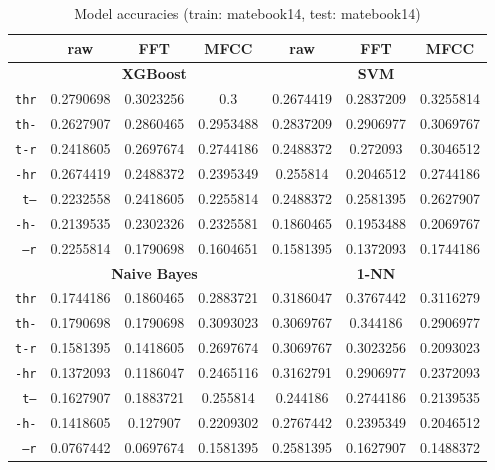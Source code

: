 \documentclass[../main.tex]{subfiles}
\begin{document}
\begin{table}[ht]
	\centering
	\caption{Model accuracies (train: matebook14, test: matebook14)}
	\vspace{-0.15cm}
	\label{tab:model_acc_matebook14_matebook14}
	\begin{small}
	\begin{tabular}{|r|c|c|c|c|c|c|}
		\hline
		 & \textbf{raw} & \textbf{FFT} & \textbf{MFCC} & \textbf{raw} & \textbf{FFT} & \textbf{MFCC} \\
		\hline
		 & \multicolumn{3}{|c|}{\textbf{XGBoost}} & \multicolumn{3}{|c|}{\textbf{SVM}} \\
		\hline
		\texttt{thr} & 0.2790698 & 0.3023256 & 0.3 & 0.2674419 & 0.2837209 & 0.3255814 \\
		\texttt{th-} & 0.2627907 & 0.2860465 & 0.2953488 & 0.2837209 & 0.2906977 & 0.3069767 \\
		\texttt{t-r} & 0.2418605 & 0.2697674 & 0.2744186 & 0.2488372 & 0.272093 & 0.3046512 \\
		\texttt{-hr} & 0.2674419 & 0.2488372 & 0.2395349 & 0.255814 & 0.2046512 & 0.2744186 \\
		\texttt{t--} & 0.2232558 & 0.2418605 & 0.2255814 & 0.2488372 & 0.2581395 & 0.2627907 \\
		\texttt{-h-} & 0.2139535 & 0.2302326 & 0.2325581 & 0.1860465 & 0.1953488 & 0.2069767 \\
		\texttt{--r} & 0.2255814 & 0.1790698 & 0.1604651 & 0.1581395 & 0.1372093 & 0.1744186 \\
		\hline
		 & \multicolumn{3}{|c|}{\textbf{Naive Bayes}} & \multicolumn{3}{|c|}{\textbf{1-NN}} \\
		\hline
		\texttt{thr} & 0.1744186 & 0.1860465 & 0.2883721 & 0.3186047 & 0.3767442 & 0.3116279 \\
		\texttt{th-} & 0.1790698 & 0.1790698 & 0.3093023 & 0.3069767 & 0.344186 & 0.2906977 \\
		\texttt{t-r} & 0.1581395 & 0.1418605 & 0.2697674 & 0.3069767 & 0.3023256 & 0.2093023 \\
		\texttt{-hr} & 0.1372093 & 0.1186047 & 0.2465116 & 0.3162791 & 0.2906977 & 0.2372093 \\
		\texttt{t--} & 0.1627907 & 0.1883721 & 0.255814 & 0.244186 & 0.2744186 & 0.2139535 \\
		\texttt{-h-} & 0.1418605 & 0.127907 & 0.2209302 & 0.2767442 & 0.2395349 & 0.2046512 \\
		\texttt{--r} & 0.0767442 & 0.0697674 & 0.1581395 & 0.2581395 & 0.1627907 & 0.1488372 \\

\end{tabular}
\end{small}
\end{table}
\end{document}
